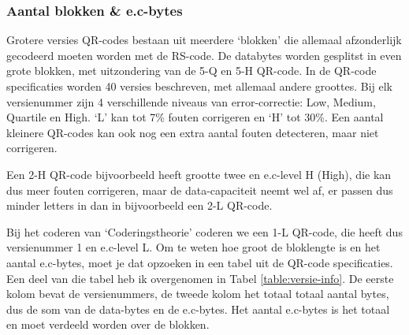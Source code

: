 \documentclass[a4paper]{article}
\begin{document}
\subsubsection{Aantal blokken \& e.c-bytes}
Grotere versies QR-codes bestaan uit meerdere `blokken' die allemaal afzonderlijk gecodeerd moeten worden met de RS-code. De databytes worden gesplitst in even grote blokken, met uitzondering van de 5-Q en 5-H QR-code. In de QR-code specificaties worden 40 versies beschreven, met allemaal andere groottes. Bij elk versienummer zijn 4 verschillende niveaus van error-correctie: Low, Medium, Quartile en High. `L' kan tot 7\% fouten corrigeren en `H' tot 30\%. Een aantal kleinere QR-codes kan ook nog een extra aantal fouten detecteren, maar niet corrigeren.

Een 2-H QR-code bijvoorbeeld heeft grootte twee en e.c-level H (High), die kan dus meer fouten corrigeren, maar de data-capaciteit neemt wel af, er passen dus minder letters in dan in bijvoorbeeld een 2-L QR-code.

Bij het coderen van `Coderingstheorie' coderen we een 1-L QR-code, die heeft dus versienummer 1 en e.c-level L. Om te weten hoe groot de bloklengte is en het aantal e.c-bytes, moet je dat opzoeken in een tabel uit de QR-code specificaties. Een deel van die tabel heb ik overgenomen in Tabel \ref{table:versie-info}.
De eerste kolom bevat de versienummers, de tweede kolom het totaal totaal aantal bytes, dus de som van de data-bytes en de e.c-bytes. Het aantal e.c-bytes is het totaal en moet verdeeld worden over de blokken.
\end{document}
